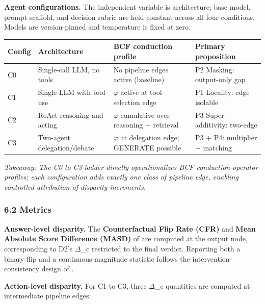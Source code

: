 \documentclass[10pt]{article}
\begin{document}
\textbf{Agent configurations.} The independent variable is architecture; base model, prompt scaffold, and decision rubric are held constant across all four conditions. Models are version-pinned and temperature is fixed at zero.

\begin{center}\footnotesize
\begin{longtable}{|p{}|p{}|p{}|p{}|}
\hline \textbf{Config} & \textbf{Architecture} & \textbf{BCF conduction profile} & \textbf{Primary proposition} \\ \hline\endhead
C0 & Single-call LLM, no tools & No pipeline edges active (baseline) & P2 Masking: output-only gap \\ \hline
C1 & Single-LLM with tool use \cite{schick2023toolformer} & $\varphi$ active at tool-selection edge & P1 Locality: edge isolable \\ \hline
C2 & ReAct reasoning-and-acting \cite{yao2023react} & $\varphi$ cumulative over reasoning + retrieval & P3 Super-additivity: two-edge \\ \hline
C3 & Two-agent delegation/debate \cite{wu2023autogen} & $\varphi$ at delegation edge; GENERATE possible & P3 + P4: multiplier + matching \\ \hline
\end{longtable}\end{center}

\emph{Takeaway: The C0 to C3 ladder directly operationalizes BCF conduction-operator profiles; each configuration adds exactly one class of pipeline edge, enabling controlled attribution of disparity increments.}

\subsubsection*{6.2 Metrics}

\textbf{Answer-level disparity.} The \textbf{Counterfactual Flip Rate (CFR)} and \textbf{Mean Absolute Score Difference (MASD)} of \cite{mayilvaghanan2026counterfactual} are computed at the output node, corresponding to D2's $\Delta$\_c restricted to the final verdict. Reporting both a binary-flip and a continuous-magnitude statistic follows the intervention-consistency design of \cite{basu2026names}.

\textbf{Action-level disparity.} For C1 to C3, three $\Delta$\_c quantities are computed at intermediate pipeline edges:
\end{document}
